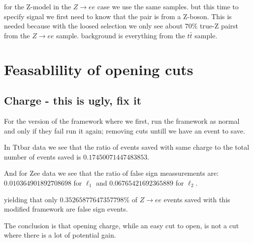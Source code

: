 \documentclass{tufte-book}
\begin{document}
for the Z-model in the \(Z\to e e\) case we use the same samples. but this time to specify signal we first need to know that the pair is from a Z-boson.
This is needed because with the loosed selection we only see about \(70\%\) true-Z pairst from the \(Z\to e e\) sample.
background is everything from the \(t\bar{t}\) sample.





\section{Feasablility of opening cuts}

\subsection{Charge - this is ugly, fix it}
For the version of the framework where we first, run the framework as normal and only if they fail run it again; removing cuts untill we have an event to save.

In Ttbar data we see that the ratio of events saved with same charge to the total number of events saved is \(0.17450071447483853\). 

And for Zee data we see that the ratio of false sign meassurements are:
\(0.010364901892708698\) for \(\ell_1\) and \(0.06765421692365889\) for \(\ell_2\).

yielding that only \(0.35265877647357798\%\) of \(Z\to ee\) events saved with this modified framework are false sign events.

The conclusion is that opening charge, while an easy cut to open, is not a cut where there is a lot of potential gain. 
\end{document}

